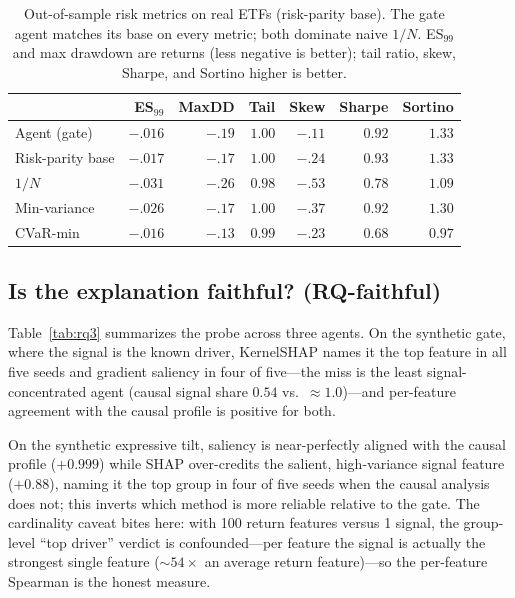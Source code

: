 \documentclass[sigconf,anonymous,review]{acmart}
\begin{document}
\begin{table}[t]
  \caption{Out-of-sample risk metrics on real ETFs (risk-parity base). The gate agent
  matches its base on every metric; both dominate naive $1/N$. ES$_{99}$ and max
  drawdown are returns (less negative is better); tail ratio, skew, Sharpe, and Sortino
  higher is better.}
  \label{tab:metrics}
  \small
  \begin{tabular}{lrrrrrr}
    \toprule
     & ES$_{99}$ & MaxDD & Tail & Skew & Sharpe & Sortino\\
    \midrule
    Agent (gate)     & $-.016$ & $-.19$ & $1.00$ & $-.11$ & $0.92$ & $1.33$\\
    Risk-parity base & $-.017$ & $-.17$ & $1.00$ & $-.24$ & $0.93$ & $1.33$\\
    $1/N$            & $-.031$ & $-.26$ & $0.98$ & $-.53$ & $0.78$ & $1.09$\\
    Min-variance     & $-.026$ & $-.17$ & $1.00$ & $-.37$ & $0.92$ & $1.30$\\
    CVaR-min         & $-.016$ & $-.13$ & $0.99$ & $-.23$ & $0.68$ & $0.97$\\
    \bottomrule
  \end{tabular}
\end{table}

\subsection{Is the explanation faithful? (RQ-faithful)}
Table~\ref{tab:rq3} summarizes the probe across three agents. On the synthetic gate,
where the signal is the known driver, KernelSHAP names it the top feature in all five
seeds and gradient saliency in four of five---the miss is the least
signal-concentrated agent (causal signal share $0.54$ vs.\ $\approx1.0$)---and
per-feature agreement with the causal profile is positive for both.

On the synthetic expressive tilt, saliency is near-perfectly aligned with the causal
profile ($+0.999$) while SHAP over-credits the salient, high-variance signal feature
($+0.88$), naming it the top group in four of five seeds when the causal analysis
does not; this inverts which method is more reliable relative to the gate. The
cardinality caveat bites here: with 100 return features versus 1 signal, the
group-level ``top driver'' verdict is confounded---per feature the signal is actually
the strongest single feature ($\sim54\times$ an average return feature)---so the
per-feature Spearman is the honest measure.
\end{document}
